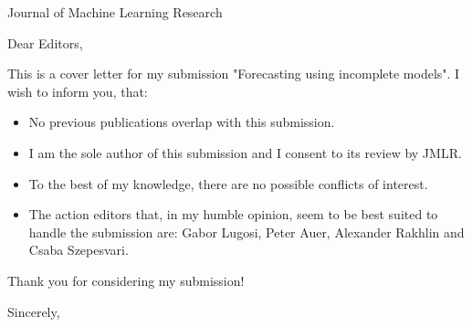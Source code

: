 \documentclass{letter}
\begin{document}


\address{Email: vadim.kosoy@intelligence.org\\Post: Shraga Rafaeli 3/15\\
Petah Tikva\\
Israel}

\begin{letter}{Journal of Machine Learning Research} %

\opening{Dear Editors,}

This is a cover letter for my submission "Forecasting using incomplete models". I wish to inform you, that:

\begin{itemize}
\item No previous publications overlap with this submission.
\item I am the sole author of this submission and I consent to its review by JMLR.
\item To the best of my knowledge, there are no possible conflicts of interest.
\item The action editors that, in my humble opinion, seem to be best suited to handle the submission are: Gabor Lugosi, Peter Auer, Alexander Rakhlin and Csaba Szepesvari.
\end{itemize}

Thank you for considering my submission!

\signature{Vadim Kosoy}
\closing{Sincerely,}




\end{letter}
\end{document}
